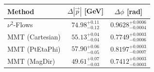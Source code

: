     \begin{tabular}{lcc}
        \toprule
        Method & $\Delta |\vec p|$ [GeV] & $\Delta \phi$ [rad] \\
        \midrule
        $\nu^2$-Flows & $74.98^{+0.11}_{-0.12}$ & $0.9628^{+0.0006}_{-0.0004}$ \\
        MMT (Cartesian) & $55.13^{+0.04}_{-0.04}$ & $0.7749^{+0.0003}_{-0.0006}$ \\
        MMT (PtEtaPhi) & $57.90^{+0.06}_{-0.05}$ & $0.8197^{+0.0003}_{-0.0007}$ \\
        MMT (MagDir) & $49.61^{+0.07}_{-0.03}$ & $0.7412^{+0.0003}_{-0.0003}$ \\
        \bottomrule
    \end{tabular}